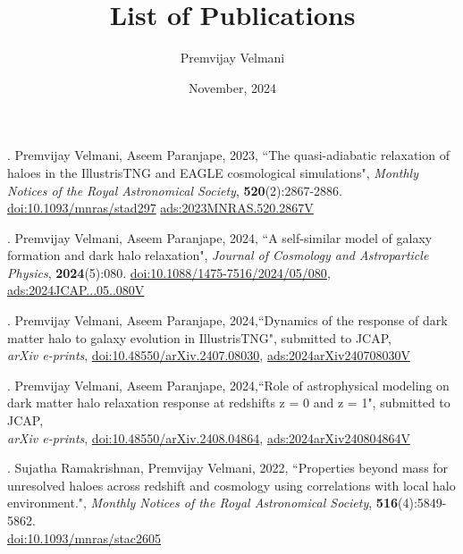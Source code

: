 \documentclass[12pt]{article}
\title{List of Publications}
\author{Premvijay Velmani}
\date{November, 2024}
\newcommand{\doi}[1]{\href{https://doi.org/#1}{doi:#1}}
\begin{document}
\maketitle


. Premvijay Velmani, Aseem Paranjape, 2023, ``The quasi-adiabatic relaxation of haloes in the IllustrisTNG and EAGLE cosmological simulations", \textit{Monthly Notices of the Royal Astronomical Society}, 
\textbf{520}(2):2867-2886. 
\doi{10.1093/mnras/stad297}
\href{https://ui.adsabs.harvard.edu/abs/2023MNRAS.520.2867V}{ads:2023MNRAS.520.2867V}


\vspace{0.5cm}

. Premvijay Velmani, Aseem Paranjape, 2024, ``A self-similar model of galaxy formation and dark halo relaxation", \textit{Journal of Cosmology and Astroparticle Physics}, 
\textbf{2024}(5):080. 
\doi{10.1088/1475-7516/2024/05/080},
\href{https://ui.adsabs.harvard.edu/abs/2024JCAP...05..080V}{ads:2024JCAP...05..080V}

\vspace{0.5cm}

. Premvijay Velmani, Aseem Paranjape, 2024,``Dynamics of the response of dark matter halo to galaxy evolution in IllustrisTNG", submitted to JCAP, \\ \textit{arXiv e-prints},
\doi{10.48550/arXiv.2407.08030}, 
\href{https://ui.adsabs.harvard.edu/abs/2024arXiv240708030V}{ads:2024arXiv240708030V}

\vspace{0.5cm}

. Premvijay Velmani, Aseem Paranjape, 2024,``Role of astrophysical modeling on dark matter halo relaxation response at redshifts z = 0 and z = 1", submitted to JCAP, \\ \textit{arXiv e-prints},
\doi{10.48550/arXiv.2408.04864}, 
\href{https://ui.adsabs.harvard.edu/abs/2024arXiv240804864V}{ads:2024arXiv240804864V}

\vspace{0.5cm}

. Sujatha Ramakrishnan, Premvijay Velmani, 2022, ``Properties beyond mass
for unresolved haloes across redshift and cosmology using correlations with local halo environment.", \textit{Monthly Notices of the Royal Astronomical Society}, 
\textbf{516}(4):5849-5862. \\
\doi{10.1093/mnras/stac2605}
\end{document}
